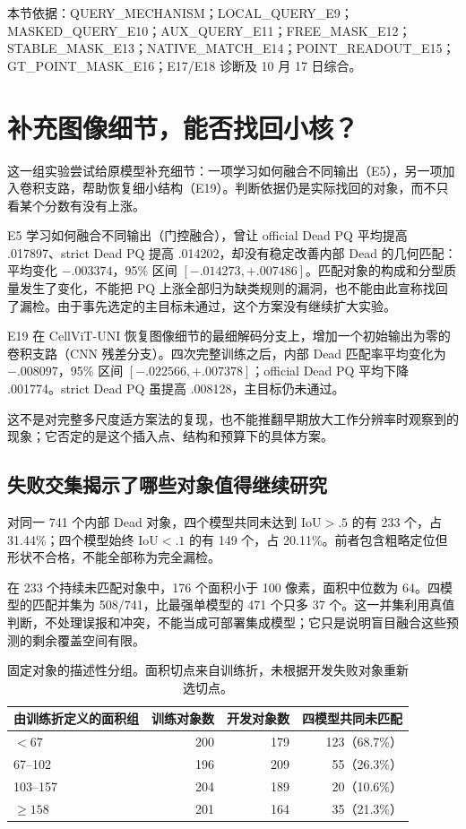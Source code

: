 \documentclass[UTF8,zihao=-4,fontset=windows]{ctexart}
\newcommand{\src}[1]{\par{\footnotesize\color{gray}本节依据：#1}\par}
\begin{document}
\src{QUERY\_\allowbreak{}MECHANISM；LOCAL\_\allowbreak{}QUERY\_\allowbreak{}E9；MASKED\_\allowbreak{}QUERY\_\allowbreak{}E10；AUX\_\allowbreak{}QUERY\_\allowbreak{}E11；FREE\_\allowbreak{}MASK\_\allowbreak{}E12；STABLE\_\allowbreak{}MASK\_\allowbreak{}E13；NATIVE\_\allowbreak{}MATCH\_\allowbreak{}E14；POINT\_\allowbreak{}READOUT\_\allowbreak{}E15；GT\_\allowbreak{}POINT\_\allowbreak{}MASK\_\allowbreak{}E16；E17/E18 诊断及 10 月 17 日综合。}

\section{补充图像细节，能否找回小核？}

这一组实验尝试给原模型补充细节：一项学习如何融合不同输出（E5），另一项加入卷积支路，帮助恢复细小结构（E19）。判断依据仍是实际找回的对象，而不只看某个分数有没有上涨。

E5 学习如何融合不同输出（门控融合），曾让 official Dead PQ 平均提高 .017897、strict Dead PQ 提高 .014202，却没有稳定改善内部 Dead 的几何匹配：平均变化 $-.003374$，95\% 区间 $[-.014273,+.007486]$。匹配对象的构成和分型质量发生了变化，不能把 PQ 上涨全部归为缺类规则的漏洞，也不能由此宣称找回了漏检。由于事先选定的主目标未通过，这个方案没有继续扩大实验。

E19 在 CellViT-UNI 恢复图像细节的最细解码分支上，增加一个初始输出为零的卷积支路（CNN 残差分支）。四次完整训练之后，内部 Dead 匹配率平均变化为 $-.008097$，95\% 区间 $[-.022566,+.007378]$；official Dead PQ 平均下降 .001774。strict Dead PQ 虽提高 .008128，主目标仍未通过。

这不是对完整多尺度适方案法的复现，也不能推翻早期放大工作分辨率时观察到的现象；它否定的是这个插入点、结构和预算下的具体方案。

\subsection{失败交集揭示了哪些对象值得继续研究}

对同一 741 个内部 Dead 对象，四个模型共同未达到 IoU$>.5$ 的有 233 个，占 31.44\%；四个模型始终 IoU$<.1$ 的有 149 个，占 20.11\%。前者包含粗略定位但形状不合格，不能全部称为完全漏检。

在 233 个持续未匹配对象中，176 个面积小于 100 像素，面积中位数为 64。四模型的匹配并集为 508/741，比最强单模型的 471 个只多 37 个。这一并集利用真值判断，不处理误报和冲突，不能当成可部署集成模型；它只是说明盲目融合这些预测的剩余覆盖空间有限。

\begin{table}[H]\centering\small
\begin{tabular}{lrrr}\toprule
由训练折定义的面积组 & 训练对象数 & 开发对象数 & 四模型共同未匹配\\\midrule
$<67$ & 200 & 179 & 123（68.7\%）\\
67--102 & 196 & 209 & 55（26.3\%）\\
103--157 & 204 & 189 & 20（10.6\%）\\
$\ge158$ & 201 & 164 & 35（21.3\%）\\\bottomrule
\end{tabular}
\caption{固定对象的描述性分组。面积切点来自训练折，未根据开发失败对象重新选切点。}
\end{table}
\end{document}
